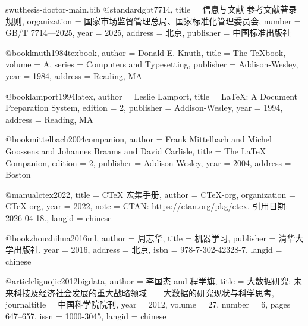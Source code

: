 
\begin{filecontents*}[overwrite]{swuthesis-doctor-main.bib}
@standard{gbt7714,
  title        = {信息与文献 参考文献著录规则},
  organization = {国家市场监督管理总局、国家标准化管理委员会},
  number       = {GB/T 7714---2025},
  year         = {2025},
  address      = {北京},
  publisher    = {中国标准出版社}
}

@book{knuth1984texbook,
  author    = {Donald E. Knuth},
  title     = {The {\TeX}book},
  volume    = {A},
  series    = {Computers and Typesetting},
  publisher = {Addison-Wesley},
  year      = {1984},
  address   = {Reading, MA}
}

@book{lamport1994latex,
  author    = {Leslie Lamport},
  title     = {{\LaTeX}: A Document Preparation System},
  edition   = {2},
  publisher = {Addison-Wesley},
  year      = {1994},
  address   = {Reading, MA}
}

@book{mittelbach2004companion,
  author    = {Frank Mittelbach and Michel Goossens and Johannes Braams and David Carlisle},
  title     = {The {\LaTeX} Companion},
  edition   = {2},
  publisher = {Addison-Wesley},
  year      = {2004},
  address   = {Boston}
}

@manual{ctex2022,
  title        = {{CTeX} 宏集手册},
  author       = {{CTeX-org}},
  organization = {CTeX-org},
  year         = {2022},
  note         = {CTAN: https://ctan.org/pkg/ctex. 引用日期: 2026-04-18.},
  langid       = {chinese}
}

@book{zhouzhihua2016ml,
  author    = {周志华},
  title     = {机器学习},
  publisher = {清华大学出版社},
  year      = {2016},
  address   = {北京},
  isbn      = {978-7-302-42328-7},
  langid    = {chinese}
}

@article{liguojie2012bigdata,
  author       = {李国杰 and 程学旗},
  title        = {大数据研究: 未来科技及经济社会发展的重大战略领域——大数据的研究现状与科学思考},
  journaltitle = {中国科学院院刊},
  year         = {2012},
  volume       = {27},
  number       = {6},
  pages        = {647--657},
  issn         = {1000-3045},
  langid       = {chinese}
}


\end{filecontents*}
